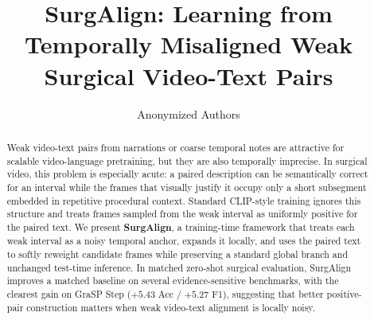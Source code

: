 \documentclass[runningheads]{llncs}
\title{SurgAlign: Learning from Temporally Misaligned Weak Surgical Video-Text Pairs}
\author{Anonymized Authors}
\institute{Anonymized Institution\\
\email{anonymized@email.com}}
\begin{document}
\maketitle

\begin{abstract}
Weak video-text pairs from narrations or coarse temporal notes are attractive for scalable video-language pretraining, but they are also temporally imprecise. In surgical video, this problem is especially acute: a paired description can be semantically correct for an interval while the frames that visually justify it occupy only a short subsegment embedded in repetitive procedural context. Standard CLIP-style training ignores this structure and treats frames sampled from the weak interval as uniformly positive for the paired text. We present \textbf{SurgAlign}, a training-time framework that treats each weak interval as a noisy temporal anchor, expands it locally, and uses the paired text to softly reweight candidate frames while preserving a standard global branch and unchanged test-time inference. In matched zero-shot surgical evaluation, SurgAlign improves a matched baseline on several evidence-sensitive benchmarks, with the clearest gain on GraSP Step ($+5.43$ Acc / $+5.27$ F1), suggesting that better positive-pair construction matters when weak video-text alignment is locally noisy.

\end{abstract}










\end{document}
